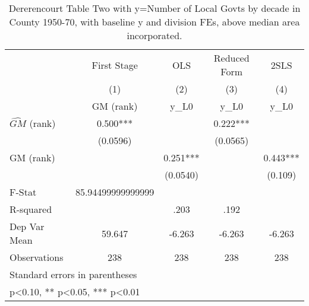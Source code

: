 \begin{table}[htbp]\centering
\def\sym#1{\ifmmode^{#1}\else\(^{#1}\)\fi}
\caption{Dererencourt Table Two with y=Number of Local Govts by decade in County 1950-70, with baseline y and division FEs, above median area incorporated.}
\begin{tabular}{l*{4}{c}}
\toprule
                    & First Stage   &         OLS   &Reduced Form   &        2SLS   \\
                    &\multicolumn{1}{c}{(1)}&\multicolumn{1}{c}{(2)}&\multicolumn{1}{c}{(3)}&\multicolumn{1}{c}{(4)}\\
                    &\multicolumn{1}{c}{GM  (rank)}&\multicolumn{1}{c}{y\_L0}&\multicolumn{1}{c}{y\_L0}&\multicolumn{1}{c}{y\_L0}\\
\midrule
$\hat{GM}$ (rank)   &       0.500***&               &       0.222***&               \\
                    &    (0.0596)   &               &    (0.0565)   &               \\
\addlinespace
GM  (rank)          &               &       0.251***&               &       0.443***\\
                    &               &    (0.0540)   &               &     (0.109)   \\
\midrule
F-Stat              &85.94499999999999   &               &               &               \\
R-squared           &               &        .203   &        .192   &               \\
Dep Var Mean        &      59.647   &      -6.263   &      -6.263   &      -6.263   \\
Observations        &         238   &         238   &         238   &         238   \\
\bottomrule
\multicolumn{5}{l}{\footnotesize Standard errors in parentheses}\\
\multicolumn{5}{l}{\footnotesize * p<0.10, ** p<0.05, *** p<0.01}\\
\end{tabular}
\end{table}
